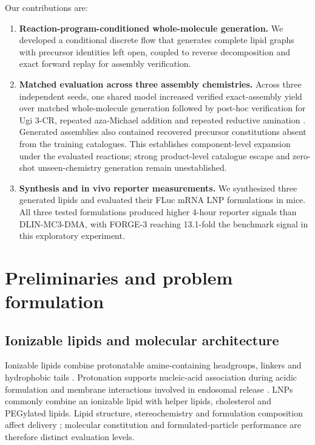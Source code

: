 \documentclass{article}
\theoremstyle{definition}
\begin{document}
Our contributions are:
\begin{enumerate}
    \item \textbf{Reaction-program-conditioned whole-molecule generation.}
    We developed a conditional discrete flow that generates complete lipid graphs with precursor
    identities left open, coupled to reverse decomposition and exact forward replay for assembly
    verification.
    \item \textbf{Matched evaluation across three assembly chemistries.}
    Across three independent seeds, one shared model increased verified exact-assembly yield over
    matched whole-molecule generation followed by post-hoc verification for Ugi 3-CR, repeated
    aza-Michael addition and repeated reductive amination
    \citep{xu2024agile,li2023combinatorial,xue2024barcoding}. Generated assemblies also contained
    recovered precursor constitutions absent from the training catalogues. This establishes
    component-level expansion under the evaluated reactions; strong product-level catalogue escape
    and zero-shot unseen-chemistry generation remain unestablished.
    \item \textbf{Synthesis and in vivo reporter measurements.}
    We synthesized three generated lipids and evaluated their FLuc mRNA LNP formulations in mice.
    All three tested formulations produced higher 4-hour reporter signals than DLIN-MC3-DMA, with
    FORGE-3 reaching 13.1-fold the benchmark signal in this exploratory experiment.
\end{enumerate}

\section{Preliminaries and problem formulation}
\label{sec:preliminaries}

\subsection{Ionizable lipids and molecular architecture}
\label{sec:lipid-background}
Ionizable lipids combine protonatable amine-containing headgroups, linkers and hydrophobic tails
\citep{semple2010rational,jayaraman2012maximizing}. Protonation supports nucleic-acid association
during acidic formulation and membrane interactions involved in endosomal release
\citep{xu2024agile}. LNPs commonly combine an ionizable lipid with helper lipids, cholesterol and
PEGylated lipids. Lipid structure, stereochemistry and formulation composition affect delivery
\citep{han2021ionizable,hatit2023nanoparticle,cheng2020selective}; molecular constitution and
formulated-particle performance are therefore distinct evaluation levels.
\end{document}
